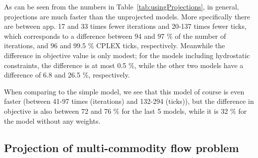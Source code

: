 As can be seen from the numbers in Table~\ref{tab:usingProjections}, in general, projections are much faster than the unprojected models. More specifically there are between app. 17 and 33 times fewer iterations and 20-137 times fewer ticks, which corresponds to a difference between 94 and 97 \% of the number of iterations, and 96 and 99.5 \% CPLEX ticks, respectively. 
Meanwhile the difference in objective value is only modest; for the models including hydrostatic constraints, the difference is at most 0.5 \%, while the other two models have a difference of 6.8 and 26.5 \%, respectively. 



When comparing to the simple model, we see that this model of course is even faster (between 41-97 times (iterations) and 132-294 (ticks)), but the difference in objective is also between 72 and 76 \% for the last 5 models, while it is 32 \% for the model without any weights. 

\subsection{Projection of multi-commodity flow problem}

